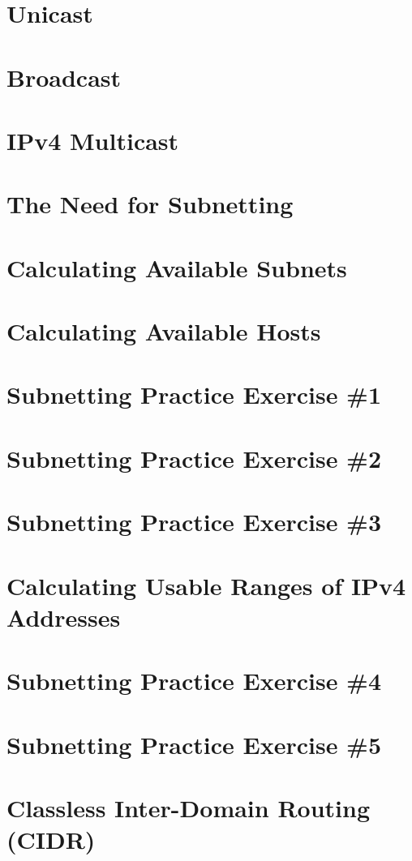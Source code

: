 \section{Unicast} 
\section{Broadcast}
\section{IPv4 Multicast}
\section{The Need for Subnetting}
\section{Calculating Available Subnets}
\section{Calculating Available Hosts}
\section{Subnetting Practice Exercise \#1}
\section{Subnetting Practice Exercise \#2}
\section{Subnetting Practice Exercise \#3}
\section{Calculating Usable Ranges of IPv4 Addresses}
\section{Subnetting Practice Exercise \#4}
\section{Subnetting Practice Exercise \#5}
\section{Classless Inter-Domain Routing (CIDR)}
